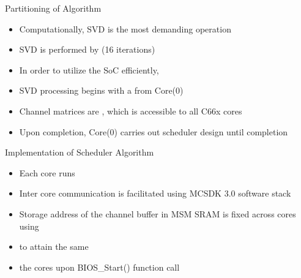 \documentclass[11pt]{beamer}
\begin{document}
\begin{frame}{Partitioning of Algorithm}
	\begin{itemize}
		\item Computationally, SVD is the most demanding operation
		\item SVD is performed by  (16 iterations)
		\item In order to utilize the SoC efficiently, 
		\item SVD processing begins with a  from Core(0)
		\item Channel matrices are , which is accessible to all C66x cores
		\item Upon completion, Core(0) carries out scheduler design until completion
	\end{itemize}
\end{frame}

\begin{frame}{Implementation of Scheduler Algorithm}
	\begin{itemize}
		\item Each core runs 
		\item Inter core communication is facilitated using MCSDK 3.0 software stack
		\item Storage address of the channel buffer in MSM SRAM is fixed across cores using 
		\item {} to attain the same
		\item {} the cores upon {BIOS\_Start()} function call
	\end{itemize}
\end{frame}
\end{document}
